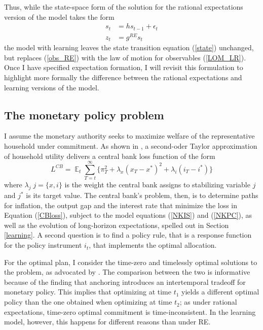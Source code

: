 \documentclass[11pt]{article}
\renewcommand{\[}{\begin{equation}}
\renewcommand{\]}{\end{equation}}
\DeclareMathOperator{\E}{\mathbb{E}}
\begin{document}
 Thus, while the state-space form of the solution for the rational expectations version of the model takes the form
 \begin{align}
 s_t & = h s_{t-1} + \epsilon_t \label{state} \\
 z_t & = g^{RE} s_t \label{obs_RE}
 \end{align}
 the model with learning leaves the state transition equation (\ref{state}) unchanged, but replaces (\ref{obs_RE}) with the law of motion for observables (\ref{LOM_LR}). Once I have specified expectation formation, I will revisit this formulation to highlight more formally the difference between the rational expectations and learning versions of the model. 

\subsection{The monetary policy problem}\label{monpol}
I assume the monetary authority seeks to maximize welfare of the representative household under commitment. As shown in \cite{woodford2011interest}, a second-oder Taylor approximation of household utility delivers a central bank loss function of the form
\begin{equation}
L^{CB} =\E_t \sum_{T=t}^{\infty}\{\pi_T^2 +\lambda_x(x_T - x^*)^2 +\lambda_i(i_T - i^*)\} \label{CBloss}
\end{equation}
where $\lambda_j \; j=\{x,i\}$ is the weight the central bank assigns to stabilizing variable $j$ and $j^*$ is its target value. The central bank's problem, then, is to determine paths for inflation, the output gap and the interest rate that minimize the loss in Equation (\ref{CBloss}), subject to the model equations (\ref{NKIS}) and (\ref{NKPC}), as well as the evolution of long-horizon expectations, spelled out in Section \ref{learning}. A second question is to find a policy rule, that is a response function for the policy instrument $i_t$, that implements the optimal allocation.

For the optimal plan, I consider the time-zero and timelessly optimal solutions to the problem, as advocated by \cite{woodford2011interest}. The comparison between the two is informative because of the finding that anchoring introduces an intertemporal tradeoff for monetary policy. This implies that optimizing at time $t_1$ yields a different optimal policy than the one obtained when optimizing at time $t_2$; as under rational expectations, time-zero optimal commitment is time-inconsistent. In the learning model, however, this happens for different reasons than under RE. 
\end{document}
